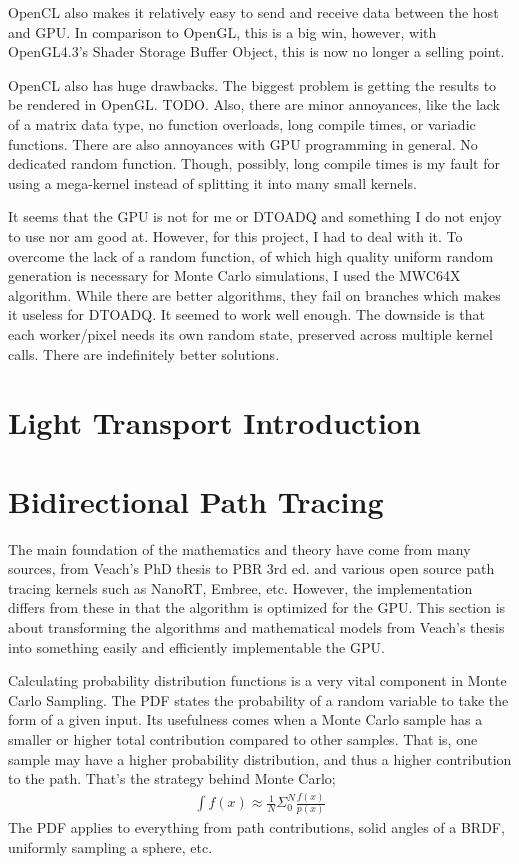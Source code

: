\message{ !name(test.tex)}\documentclass{article}
\begin{document}
  	OpenCL also makes it relatively easy to send and receive data between the host and GPU. In comparison to OpenGL, this is a big win, however, with OpenGL4.3's Shader Storage Buffer Object, this is now no longer a selling point.
  	
  	OpenCL also has huge drawbacks. The biggest problem is getting the results to be rendered in OpenGL. TODO. Also, there are minor annoyances, like the lack of a matrix data type, no function overloads, long compile times, or variadic functions. There are also annoyances with GPU programming in general. No dedicated random function. Though, possibly, long compile times is my fault for using a mega-kernel instead of splitting it into many small kernels.
  	
  	It seems that the GPU is not for me or DTOADQ and something I do not enjoy to use nor am good at. However, for this project, I had to deal with it. To overcome the lack of a random function, of which high quality uniform random generation is necessary for Monte Carlo simulations, I used the MWC64X algorithm. While there are better algorithms, they fail on branches which makes it useless for DTOADQ. It seemed to work well enough. The downside is that each worker/pixel needs its own random state, preserved across multiple kernel calls. There are indefinitely better solutions.
  \section{Light Transport Introduction}
  \section{Bidirectional Path Tracing}
    The main foundation of the mathematics and theory have come from many sources, from Veach's PhD thesis to PBR 3rd ed. and various open source path tracing kernels such as NanoRT, Embree, etc. However, the implementation differs from these in that the algorithm is optimized for the GPU. This section is about transforming the algorithms and mathematical models from Veach's thesis into something easily and efficiently implementable the GPU.

    Calculating probability distribution functions is a very vital component in
    Monte Carlo Sampling. The PDF states the probability of a random variable to
    take the form of a given input. Its usefulness comes when a Monte Carlo sample has a smaller or higher total contribution compared to other samples. That is, one sample may
    have a higher probability distribution, and thus a higher contribution to
    the path. That's the strategy behind Monte Carlo;
    \begin{align}
      \int f(x) \approx \frac{1}{N}\Sigma_0^N\frac{f(x)}{p(x)}
    \end{align}
    The PDF applies to everything from path contributions, solid angles of a
    BRDF, uniformly sampling a sphere, etc.
    
\end{document}
